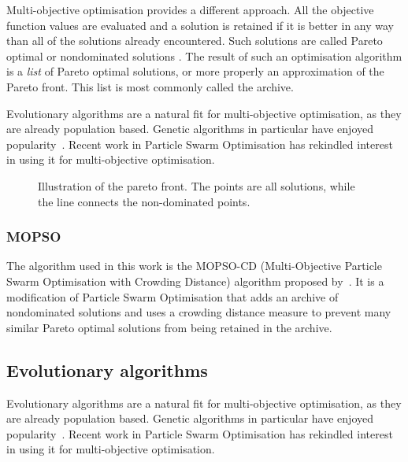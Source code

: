 Multi-objective optimisation provides a different approach.
All the objective function values are evaluated and a solution is retained if it is better in any way than all of the solutions already encountered.
Such solutions are called Pareto optimal or nondominated solutions \citep{steuer1986multiple}.
The result of such an optimisation algorithm is a \emph{list} of Pareto optimal solutions, or more properly an approximation of the Pareto front.
This list is most commonly called the archive.

Evolutionary algorithms are a natural fit for multi-objective optimisation, as they are already population based.
Genetic algorithms in particular have enjoyed popularity~\citep{deb.kalyanmoy2001multi-objective}.
Recent work in Particle Swarm Optimisation has rekindled interest in using it for multi-objective optimisation.

\begin{figure}[htbp]
  \centering
  \caption{Illustration of the pareto front.  The points are all solutions, while the line connects the non-dominated points.}
  \label{fig:paretofrontexample}
\end{figure}
\subsubsection{MOPSO}\label{sec:mopso}
The algorithm used in this work is the MOPSO-CD (Multi-Objective Particle Swarm Optimisation with Crowding Distance) algorithm proposed by~\citet{raquel.naval2005effective}.
It is a modification of Particle Swarm Optimisation that adds an archive of nondominated solutions and uses a crowding distance measure to prevent many similar Pareto optimal solutions from being retained in the archive.


\subsection{Evolutionary algorithms}
Evolutionary algorithms are a natural fit for multi-objective optimisation, as they are already population based.
Genetic algorithms in particular have enjoyed popularity~\citep{deb.kalyanmoy2001multi-objective}.
Recent work in Particle Swarm Optimisation has rekindled interest in using it for multi-objective optimisation.


